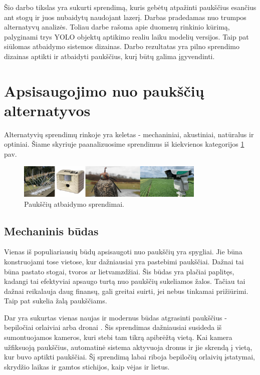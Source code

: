 \documentclass{VUMIFPSkursinis}
\begin{document}
Šio darbo tikslas yra sukurti sprendimą, kuris gebėtų atpažinti paukščius esančius ant stogų ir juos nubaidytų naudojant lazerį. Darbas pradedamas nuo trumpos alternatyvų analizės. Toliau darbe rašoma apie duomenų rinkinio kūrimą, palyginami trys YOLO objektų aptikimo realiu laiku modelių versijos. Taip pat siūlomas atbaidymo sistemos dizainas. Darbo rezultatas yra pilno sprendimo dizainas aptikti ir atbaidyti paukščius, kurį būtų galima įgyvendinti.


\section{Apsisaugojimo nuo paukščių alternatyvos}
Alternatyvių sprendimų rinkoje yra keletas - mechaniniai, akustiniai, natūralus ir optiniai. Šiame skyriuje paanalizuosime sprendimus iš kiekvienos kategorijos \ref{img:deterrents} pav.

\begin{figure}[H]
    \centering
    \includegraphics[width=0.8\textwidth]{img/deterrents.jpg}
    \caption{Paukščių atbaidymo sprendimai.}
    \label{img:deterrents}
\end{figure}

\subsection{Mechaninis būdas}
Vienas iš populiariausių būdų apsisaugoti nuo paukščių yra spygliai. Jie būna konstruojami tose vietose, kur dažniausiai yra pastebimi paukščiai. Dažnai tai būna pastato stogai, tvoros ar lietvamzdžiai. Šis būdas yra plačiai paplitęs, kadangi tai efektyviai apsaugo turtą nuo paukščių sukeliamos žalos. Tačiau tai dažnai reikalauja daug finansų, gali greitai suirti, jei nebus tinkamai prižiūrimi. Taip pat sukelia žalą paukščiams.

Dar yra sukurtas vienas naujas ir modernus būdas atgrasinti paukščius - bepiločiai orlaiviai arba dronai \cite{goel2017detection}. Šis sprendimas dažniausiai susideda iš sumontuojamos kameros, kuri stebi tam tikrą apibrėžtą vietą. Kai kamera užfiksuoją paukščius, automatinė sistema aktyvuoja dronus ir jie skrendą į vietą, kur buvo aptikti paukščiai. Šį sprendimą labai riboja bepiločių orlaivių įstatymai, skrydžio laikas ir gamtos stichijos, kaip vėjas ir lietus.
\end{document}
